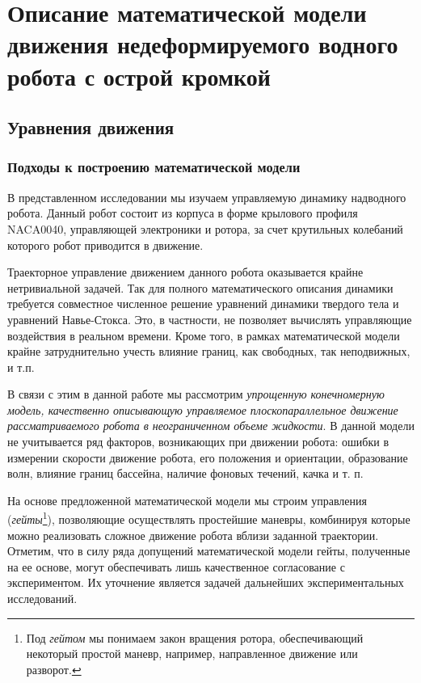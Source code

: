 \chapter{Описание математической модели движения недеформируемого водного робота с острой кромкой}\label{ch:ch6}

\section{Уравнения движения}

\subsection{Подходы к построению математической модели}


В представленном исследовании мы изучаем управляемую динамику надводного робота. Данный робот состоит из корпуса в форме крылового профиля NACA0040, управляющей электроники и ротора, за счет крутильных колебаний которого робот приводится в движение. 

Траекторное управление движением данного робота оказывается крайне нетривиальной задачей. Так для полного математического описания динамики требуется совместное численное решение уравнений динамики твердого тела и уравнений Навье-Стокса. Это, в частности, не позволяет вычислять управляющие воздействия в реальном времени. Кроме того, в рамках математической модели крайне затруднительно учесть влияние границ, как свободных, так неподвижных, и т.п.

В связи с этим в данной работе мы рассмотрим \textit{упрощенную конечномерную модель, качественно описывающую управляемое плоскопараллельное движение рассматриваемого робота в неограниченном объеме жидкости}. В данной модели не учитывается ряд факторов, возникающих при движении робота: ошибки в измерении скорости движение робота, его положения и ориентации, образование волн, влияние границ бассейна, наличие фоновых течений, качка и т. п.

На основе предложенной математической модели мы строим управления (\textit{гейты}\footnote{Под \textit{гейтом} мы понимаем закон вращения ротора, обеспечивающий некоторый простой маневр, например, направленное движение или разворот.}), позволяющие осуществлять простейшие маневры, комбинируя которые можно реализовать сложное движение робота вблизи заданной траектории. Отметим, что в силу ряда допущений математической модели гейты, полученные на ее основе, могут обеспечивать лишь качественное согласование с экспериментом. Их уточнение является задачей дальнейших экспериментальных исследований.

